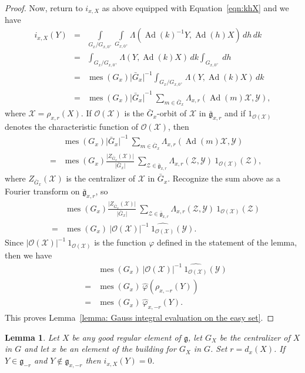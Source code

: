 \documentclass[11pt]{amsart}
\newtheorem{lemma}[theorem]{Lemma}
\theoremstyle{definition}
\theoremstyle{remark}
\numberwithin{equation}{theorem}
\def\GF{{G}}
\def\gF{{\mathfrak{g}}}
\newcommand{\Mf}{{\bar\GF}}
\newcommand{\mf}{{\bar\gF}}
\def\vphi{{\varphi}}
\def\hphi{{\hat{\varphi}}}
\def\orbit{{\mathcal{O}}}
\def\X{{\mathcal{X}}}
\def\Y{{\mathcal{Y}}}
\def\Z{{\mathcal{Z}}}
\def\kill#1#2{{\Lambda\left({#1},{#2}\right)}}
\def\i{{i}}
\def\Ad{{\rm Ad}}
\def\meas{{\operatorname{mes}}}
\def\Ad{\operatorname{Ad}}
\begin{document}
\begin{proof}
Now, return to $\i_{x,X}$ as above equipped with
Equation~\ref{eqn:khX} and we have
\begin{eqnarray*}
\i_{x,X}(Y)
    &=& \int\limits_{\GF_x / \GF_{x,0^+}} \int\limits_{\GF_{x,0^+}}
\kill{\Ad(k)^{-1}Y}{\Ad(h)X}\, dh\, dk\\
    &=& \int_{\GF_x / \GF_{x,0^+}}\kill{Y}{\Ad(k)X}\, dk
        \int_{\GF_{x,0^+}}\, dh\\
    &=& \meas(\GF_x) \vert \Mf_x\vert^{-1} \int_{\GF_x / \GF_{x,0^+}}
\kill{Y}{\Ad(k)X}\, dk\\
    &=& \meas(\GF_x) {\vert \Mf_x \vert}^{-1}\ \sum_{m \in \Mf_x}
\Lambda_{x,r}(\Ad(m)\X,\Y),
\end{eqnarray*}
where $\X = \rho_{x,r}(X)$. If $\orbit(\X)$ is the $\Mf_x$-orbit of $\X$ in
$\mf_{x,r}$ and if $1_{\orbit(\X)}$ denotes the characteristic function of
$\orbit(\X)$, then
\begin{eqnarray*}
&& \meas(\GF_x) {\vert \Mf_x \vert}^{-1}\ \sum_{m \in \Mf_x}
\Lambda_{x,r}(\Ad(m)\X,\Y)\\
 &=& \meas(\GF_x) \frac{\vert
Z_{\Mf_x}(\X) \vert}{\vert \Mf_x \vert}\
        \sum_{\Z \in \mf_{x,r}} \Lambda_{x,r}(\Z,\Y)\
        1_{\orbit(\X)}(\Z),
\end{eqnarray*}
where $Z_{\Mf_x}(\X)$ is the centralizer of $\X$ in $\Mf_x$.
Recognize the sum above as a Fourier transform on $\mf_{x,r}$, so
\begin{eqnarray*}
&&\meas(\GF_x) \frac{\vert Z_{\Mf_x}(\X) \vert}{\vert \Mf_x
\vert}\
        \sum_{\Z \in \mf_{x,r}} \Lambda_{x,r}(\Z,\Y)\
        1_{\orbit(\X)}(\Z)\\
         &=& \meas(\GF_x)\ {\vert \orbit(\X) \vert}^{-1}\
\widehat{1_{\orbit(\X)}}(\Y).
\end{eqnarray*}
Since ${\vert \orbit(\X) \vert}^{-1}\ 1_{\orbit(\X)}$ is the
function $\vphi$ defined in the statement of the lemma, then we
have
\begin{eqnarray*}
&& \meas(\GF_x)\ {\vert \orbit(\X) \vert}^{-1}\
\widehat{1_{\orbit(\X)}}(\Y)\\
    &=& \meas(\GF_x)\ \hphi(\rho_{x,-r}(Y))\\
    &=& \meas(\GF_x)\ \hphi_{x,-r}(Y).
\end{eqnarray*}
This proves Lemma~\ref{lemma: Gauss integral evaluation on the
easy set}.
\end{proof}

\begin{lemma}\label{lemma: vanishing}
Let $X$ be any good regular element of $\gF$, let $\GF_X$ be the
centralizer of $X$ in $\GF$ and let $x$ be an element of the
building for $\GF_X$ in $\GF$. Set $r=d_x(X)$. If $Y \in \gF_{-r}$
and $Y \not\in \gF_{x,-r}$ then $\i_{x,X}(Y) =0$.
\end{lemma}
\end{document}
